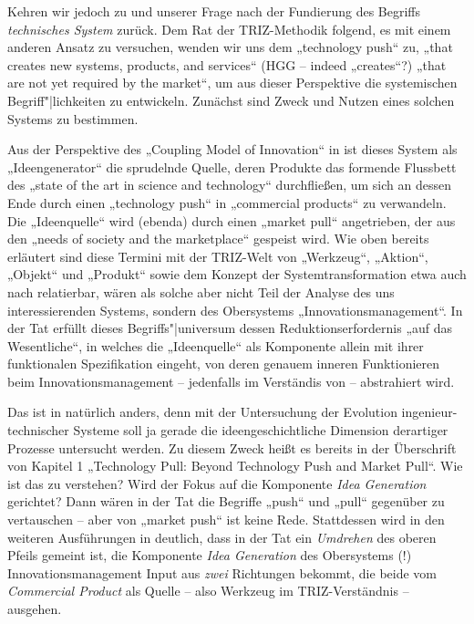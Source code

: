 \documentclass[11pt,a4paper]{article}
\begin{document}
Kehren wir jedoch zu \cite{TESE2018} und unserer Frage nach der Fundierung des
Begriffs \emph{technisches System} zurück. Dem Rat der TRIZ-Methodik folgend,
es mit einem anderen Ansatz zu versuchen, wenden wir uns dem „technology push“
\cite[S. 2]{TESE2018} zu, „that creates new systems, products, and services“
(HGG -- indeed „creates“?) „that are not yet required by the market“, um aus
dieser Perspektive die systemischen Begriff"|lichkeiten zu entwickeln.
Zunächst sind Zweck und Nutzen eines solchen Systems zu bestimmen.

Aus der Perspektive des „Coupling Model of Innovation“ in
\cite[Fig. 3]{Preez2006} ist dieses System als „Ideengenerator“ die sprudelnde
Quelle, deren Produkte das formende Flussbett des „state of the art in science
and technology“ durchfließen, um sich an dessen Ende durch einen „technology
push“ in „commercial products“ zu verwandeln.  Die „Ideenquelle“ wird (ebenda)
durch einen „market pull“ angetrieben, der aus den „needs of society and the
marketplace“ gespeist wird. Wie oben bereits erläutert sind diese Termini mit
der TRIZ-Welt von „Werkzeug“, „Aktion“, „Objekt“ und „Produkt“ sowie dem
Konzept der Systemtransformation etwa auch nach \cite{TT} relatierbar, wären
als solche aber nicht Teil der Analyse des uns interessierenden Systems,
sondern des Obersystems „Innovationsmanagement“. In der Tat erfüllt dieses
Begriffs"|universum dessen Reduktionserfordernis „auf das Wesentliche“, in
welches die „Ideenquelle“ als Komponente allein mit ihrer funktionalen
Spezifikation eingeht, von deren genauem inneren Funktionieren beim
Innovationsmanagement -- jedenfalls im Verständis von \cite{Preez2006} --
abstrahiert wird.

Das ist in \cite{TESE2018} natürlich anders, denn mit der Untersuchung der
Evolution ingenieur-technischer Systeme soll ja gerade die ideengeschichtliche
Dimension derartiger Prozesse untersucht werden.  Zu diesem Zweck heißt es
bereits in der Überschrift von Kapitel 1 „Technology Pull: Beyond Technology
Push and Market Pull“.  Wie ist das zu verstehen? Wird der Fokus auf die
Komponente \emph{Idea Generation} gerichtet? Dann wären in der Tat die
Begriffe „push“ und „pull“ gegenüber \cite{Preez2006} zu vertauschen -- aber
von „market push“ ist keine Rede.  Stattdessen wird in den weiteren
Ausführungen in \cite{TESE2018} deutlich, dass in der Tat ein \emph{Umdrehen}
des oberen Pfeils gemeint ist, die Komponente \emph{Idea Generation} des
Obersystems (!) Innovationsmanagement Input aus \emph{zwei} Richtungen
bekommt, die beide vom \emph{Commercial Product} als Quelle -- also Werkzeug
im TRIZ-Verständnis -- ausgehen.
\end{document}
